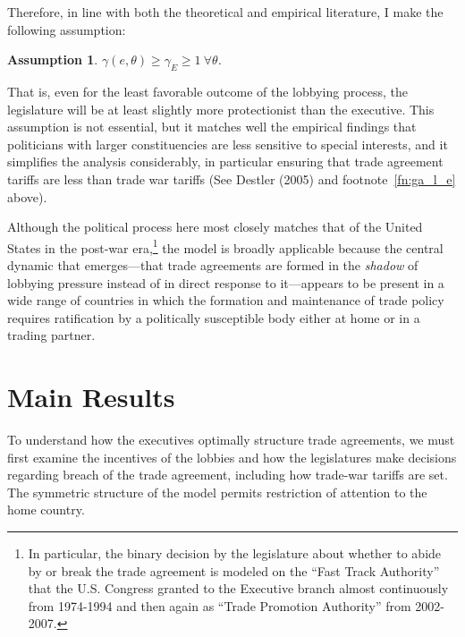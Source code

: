 \documentclass[10pt]{article}
\newtheorem{assumption}{Assumption}
\newcommand{\ve}{\theta}
\newcommand{\ga}{\gamma}
\begin{document}
Therefore, in line with both the theoretical and empirical literature, I make the following assumption:

\begin{assumption}
  $\ga(e,\ve) \geq \ga_E \geq 1 \ \forall \ve$.
  \label{as:ga_l_e}
\end{assumption}

That is, even for the least favorable outcome of the lobbying process, the legislature will be at least slightly more protectionist than the executive. This assumption is not essential, but it matches well the empirical findings that politicians with larger constituencies are less sensitive to special interests, and it simplifies the analysis considerably, in particular ensuring that trade agreement tariffs are less than trade war tariffs (See Destler (2005) and footnote~\ref{fn:ga_l_e} above).

Although the political process here most closely matches that of the United States in the post-war era,\footnote{In particular, the binary decision by the legislature about whether to abide by or break the trade agreement is modeled on the ``Fast Track Authority'' that the U.S. Congress granted to the Executive branch almost continuously from 1974-1994 and then again as ``Trade Promotion Authority'' from 2002-2007.} the model is broadly applicable because the central dynamic that emerges---that trade agreements are formed in the \textit{shadow} of lobbying pressure instead of in direct response to it---appears to be present in a wide range of countries in which the formation and maintenance of trade policy requires ratification by a politically susceptible body either at home or in a trading partner.



\section{Main Results}
\label{sec:main}
To understand how the executives optimally structure trade agreements, we must first examine the incentives of the lobbies and how the legislatures make decisions regarding breach of the trade agreement, including how trade-war tariffs are set. The symmetric structure of the model permits restriction of attention to the home country.
\end{document}
